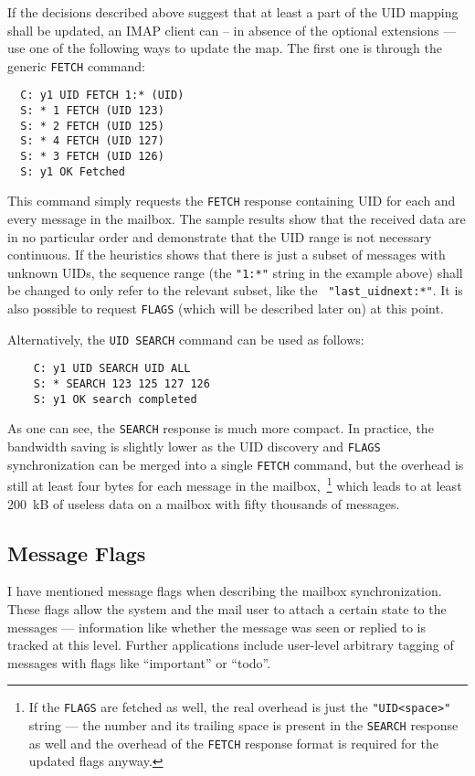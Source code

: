 \documentclass[trojita]{subfiles}
\begin{document}
If the decisions described above suggest that at least a part of the UID mapping shall be updated, an IMAP client can --
in absence of the optional extensions --- use one of the following ways to update the map.  The first one is through the
generic {\tt FETCH} command:

\begin{verbatim}
  C: y1 UID FETCH 1:* (UID)
  S: * 1 FETCH (UID 123)
  S: * 2 FETCH (UID 125)
  S: * 4 FETCH (UID 127)
  S: * 3 FETCH (UID 126)
  S: y1 OK Fetched
\end{verbatim}

This command simply requests the {\tt FETCH} response containing UID for each and every message in the mailbox.  The
sample results show that the received data are in no particular order and demonstrate that the UID range is not
necessary continuous.  If the heuristics shows that there is just a subset of messages with unknown UIDs, the sequence
range (the {\tt "1:*"} string in the example above) shall be changed to only refer to the relevant subset, like the {\tt
"last\_uidnext:*"}.  It is also possible to request {\tt FLAGS} (which will be described later on) at this point.

Alternatively, the {\tt UID SEARCH} command can be used as follows:

\begin{verbatim}
    C: y1 UID SEARCH UID ALL
    S: * SEARCH 123 125 127 126
    S: y1 OK search completed
\end{verbatim}

As one can see, the {\tt SEARCH} response is much more compact.  In practice, the bandwidth saving is slightly lower as
the UID discovery and {\tt FLAGS} synchronization can be merged into a single {\tt FETCH} command, but the overhead is
still at least four bytes for each message in the mailbox,~\footnote{If the {\tt FLAGS} are fetched as well, the real
overhead is just the {\tt "UID<space>"} string --- the number and its trailing space is present in the {\tt SEARCH}
response as well and the overhead of the {\tt FETCH} response format is required for the updated flags anyway.} which
leads to at least 200~kB of useless data on a mailbox with fifty thousands of messages.

\subsection{Message Flags}

I have mentioned message flags when describing the mailbox synchronization.  These flags allow the system and the mail
user to attach a certain state to the messages --- information like whether the message was seen or replied to is tracked
at this level.  Further applications include user-level arbitrary tagging of messages with flags like ``important'' or
``todo''.
\end{document}
